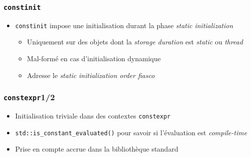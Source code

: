 \documentclass[C++.tex]{subfiles}
\begin{document}
\begin{frame}[fragile]
	\frametitle{\lstinline|constinit|}
	\begin{itemize}
		\item \lstinline|constinit| impose une initialisation durant la phase \textit{static initialization}
		\begin{itemize}
			\item Uniquement sur des objets dont la \textit{storage duration} est \textit{static} ou \textit{thread}
			\item Mal-formé en cas d'initialisation dynamique
			\item Adresse le \textit{static initialization order fiasco}
		\end{itemize}
	\end{itemize}
\end{frame}

\begin{frame}[fragile]
	\frametitle{\lstinline|constexpr|\titlehfill{}1/2}
	\begin{itemize}
		\item Initialisation triviale dans des contextes \lstinline|constexpr|
		\item \lstinline|std::is_constant_evaluated()| pour savoir si l'évaluation est \textit{compile-time}
		\item Prise en compte accrue dans la bibliothèque standard
		
	\end{itemize}
\end{frame}
\end{document}
